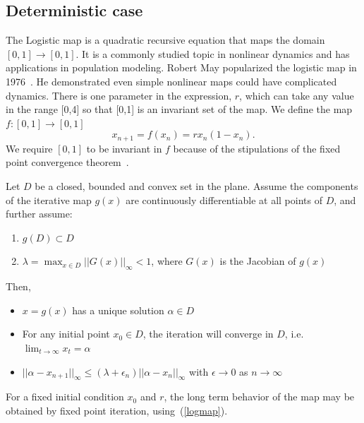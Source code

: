 \subsection{Deterministic case}
\hspace{5mm}The Logistic map is a quadratic recursive equation that maps the domain
$[0,1] \rightarrow [0,1]$. It is a commonly studied topic in nonlinear dynamics and has
applications in population modeling. Robert May popularized the
logistic map in 1976~\cite{may}. He demonstrated even simple nonlinear
maps could have complicated dynamics. There is one parameter in the
expression, $r$, which can take any value in the range [0,4] so that
[0,1] is an invariant set of the map. We define the map $f:[0,1]\to [0,1]$
\begin{equation}\label{logmap}
x_{n+1} = f(x_n) = rx_n(1-x_n).
\end{equation}
We require $[0,1]$ to be invariant in $f$ because of the stipulations
of the fixed point convergence theorem~\cite{atkinson}.
\begin{singlespace}
\begin{theorem}\label{thm:fp}
Let $D$ be a closed, bounded and convex set in the plane. Assume the
components of the iterative map $g(x)$ are continuously differentiable at all points of
$D$, and further assume: 
\begin{enumerate}
\item $g(D) \subset D$
\item $\lambda =\max_{x\in D}||G(x)||_\infty < 1$, where $G(x)$ is the Jacobian of
$g(x)$
\end{enumerate}
Then, 
\begin{itemize}
\item $x=g(x)$ has a unique solution $\alpha \in D$
\item For any initial point $x_0 \in D$, the iteration will converge
  in $D$, i.e. $\lim_{t \to \infty}x_t = \alpha$
\item $||\alpha - x_{n+1}||_\infty \leq
  (\lambda +\epsilon_n)||\alpha - x_n||_\infty$ with
  $\epsilon \to 0$ as $n\to \infty$
\end{itemize}
\end{theorem}
\end{singlespace}
 For a fixed initial condition $x_0$ and $r$, the long term behavior of
the map may be obtained by fixed point iteration, using~(\ref{logmap}). 
